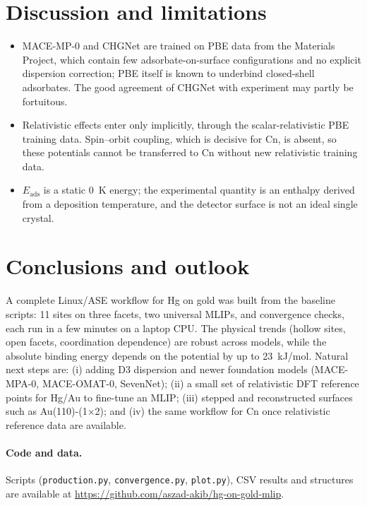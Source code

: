 \documentclass[11pt,a4paper]{article}
\begin{document}
\section{Discussion and limitations}
\begin{itemize}
\item MACE-MP-0 and CHGNet are trained on PBE data from the Materials Project, which contain few
adsorbate-on-surface configurations and no explicit dispersion correction; PBE itself is known to underbind
closed-shell adsorbates. The good agreement of CHGNet with experiment may partly be fortuitous.
\item Relativistic effects enter only implicitly, through the scalar-relativistic PBE training data.
Spin--orbit coupling, which is decisive for Cn, is absent, so these potentials cannot be transferred to Cn
without new relativistic training data.
\item $E_\mathrm{ads}$ is a static \SI{0}{K} energy; the experimental quantity is an enthalpy derived from a
deposition temperature, and the detector surface is not an ideal single crystal.
\end{itemize}

\section{Conclusions and outlook}
A complete Linux/ASE workflow for Hg on gold was built from the baseline scripts: 11 sites on three facets, two
universal MLIPs, and convergence checks, each run in a few minutes on a laptop CPU. The physical trends
(hollow sites, open facets, coordination dependence) are robust across models, while the absolute binding
energy depends on the potential by up to \SI{23}{kJ/mol}. Natural next steps are: (i) adding D3 dispersion and
newer foundation models (MACE-MPA-0, MACE-OMAT-0, SevenNet); (ii) a small set of relativistic DFT reference points
for Hg/Au to fine-tune an MLIP; (iii) stepped and reconstructed surfaces such as Au(110)-(1$\times$2); and (iv)
the same workflow for Cn once relativistic reference data are available.

\paragraph{Code and data.} Scripts (\texttt{production.py}, \texttt{convergence.py}, \texttt{plot.py}), CSV
results and structures are available at \url{https://github.com/aszad-akib/hg-on-gold-mlip}.
\end{document}
